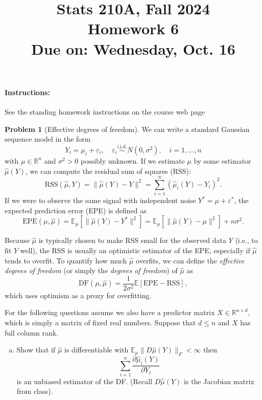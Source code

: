 \documentclass{article}
\newcommand{\EE}{\mathbb{E}}
\newcommand{\RR}{\mathbb{R}}
\newcommand{\simiid}{\overset{\text{i.i.d.}}{\sim}}
\newcommand{\ep}{\varepsilon}
\theoremstyle{definition}
\newtheorem{problem}{Problem}
\begin{document}
\title{Stats 210A, Fall 2024\\
  Homework 6 \\
  {\large {\bf Due on}: Wednesday, Oct. 16}}
\date{}

\maketitle

\paragraph{Instructions:} See the standing homework instructions on the course web page

\begin{problem}[Effective degrees of freedom]

We can write a standard Gaussian sequence model in the form
\[
Y_i = \mu_i + \ep_i, \quad \ep_i \simiid N(0,\sigma^2), \quad i = 1,\ldots,n
\]
with $\mu\in\RR^n$ and $\sigma^2 > 0$ possibly unknown. If we estimate $\mu$ by some estimator $\hat\mu(Y)$, we can compute the residual sum of squares (RSS):
\[
\text{RSS}(\hat\mu,Y) = \|\hat\mu(Y)-Y\|^2 = \sum_{i=1}^n (\hat\mu_i(Y) - Y_i)^2.
\]
If we were to observe the same signal with independent noise $Y^* = \mu + \ep^*$, the expected prediction error (EPE) is defined as
\[
\text{EPE}(\mu,\hat\mu) = \EE_\mu\left[\| \hat\mu(Y) - Y^*\|^2\right] = \EE_\mu\left[\|\hat\mu(Y)-\mu\|^2\right] + n\sigma^2.
\]

Because $\hat\mu$ is typically chosen to make RSS small for the observed data $Y$ (i.e., to fit $Y$ well), the RSS is usually an optimistic estimator of the EPE, especially if $\hat\mu$ tends to overfit. To quantify how much $\hat\mu$ overfits, we can define the {\em effective degrees of freedom} (or simply the {\em degrees of freedom}) of $\hat\mu$ as
\[
\text{DF}(\mu,\hat\mu) = \frac{1}{2\sigma^2}\EE\left[\text{EPE} - \text{RSS}\right],
\]
which uses optimism as a proxy for overfitting.

For the following questions assume we also have a predictor matrix $X\in \RR^{n\times d}$, which is simply a matrix of fixed real numbers. Suppose that $d\leq n$ and $X$ has full column rank. 

\begin{enumerate}[(a)]
\item Show that if $\hat\mu$ is differentiable with $\EE_\mu\|D\hat\mu(Y)\|_F < \infty$ then
\[
\sum_{i=1}^n \frac{\partial \hat\mu_i(Y)}{\partial Y_i}
\]
is an unbiased estimator of the DF. (Recall $D\hat\mu(Y)$ is the Jacobian matrix from class).





\end{enumerate}
\end{problem}
\end{document}
